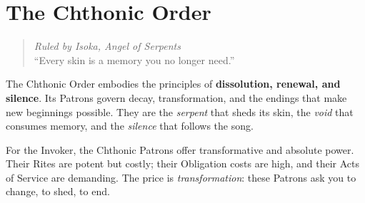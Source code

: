 \newpage

\newpage
\newpage
\newpage
\newpage
\newpage
\newpage
\newpage
\newpage
\newpage
\newpage


\section{The Chthonic Order}
\label{sec:chthonic-order}

\begin{quote}
\textit{Ruled by Isoka, Angel of Serpents} \\
``Every skin is a memory you no longer need.''
\end{quote}

The Chthonic Order embodies the principles of \textbf{dissolution, renewal, and silence}. Its Patrons govern decay, transformation, and the endings that make new beginnings possible. They are the \emph{serpent} that sheds its skin, the \emph{void} that consumes memory, and the \emph{silence} that follows the song.

For the Invoker, the Chthonic Patrons offer transformative and absolute power. Their Rites are potent but costly; their Obligation costs are high, and their Acts of Service are demanding. The price is \emph{transformation}: these Patrons ask you to change, to shed, to end.

\newpage

\newpage
\newpage
\newpage
\newpage
\newpage
\newpage
\newpage
\newpage
\newpage
\newpage

